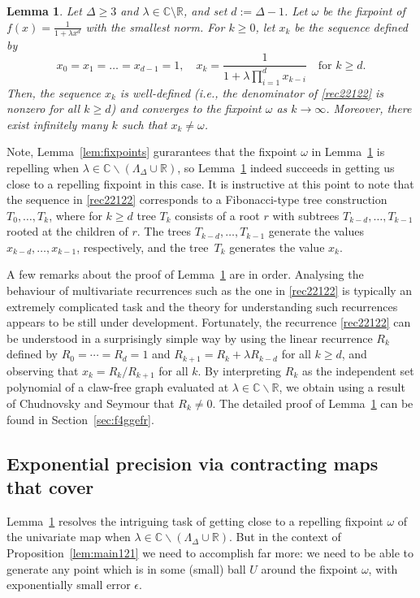 \documentclass[11pt]{article}
\newtheorem{lemma}[theorem]{Lemma}
\def\Reals{\mathbb{R}}
\def\Complex{\mathbb{C}}
\def\LambdaD{\Lambda_\Delta}
\begin{document}
\begin{lemma}\label{hop2}
Let $\Delta\geq 3$ and $\lambda\in \Complex\setminus\Reals$, and set $d:=\Delta-1$. Let $\omega$ be the fixpoint of $f(x)=\frac{1}{1+\lambda x^{d}}$ with the smallest norm. For $k\geq 0$, let $x_k$ be the sequence defined by
\begin{equation}\label{rec22122}
x_0=x_1=\dots=x_{d-1}=1, \quad x_k = \frac{1}{1+\lambda \prod_{i=1}^d x_{k-i}}\quad\mbox{for $k\geq d$}.
\end{equation}
Then, the sequence $x_k$ is well-defined (i.e., the denominator of \eqref{rec22122} is nonzero for all $k\geq d$) and converges to the fixpoint $\omega$ as $k\rightarrow \infty$. Moreover, there exist infinitely many $k$ such that $x_k\neq \omega$.
\end{lemma}
Note, Lemma~\ref{lem:fixpoints} gurarantees that the fixpoint $\omega$ in Lemma~\ref{hop2} is repelling when $\lambda\in \Complex\backslash(\LambdaD\cup \Reals)$, so Lemma~\ref{hop2} indeed succeeds in getting us close to a repelling fixpoint 
in this case.  It is instructive  at this point to note that the sequence in \eqref{rec22122} corresponds to a Fibonacci-type tree construction $T_0,\dots,T_k$, where for $k\geq d$ tree $T_k$ consists of a root $r$ with subtrees $T_{k-d},\dots,T_{k-1}$ rooted at the children of $r$.
The trees $T_{k-d},\ldots,T_{k-1}$ generate the values $x_{k-d},\hdots,x_{k-1}$, respectively,
and the tree~$T_k$ generates the   value $x_k$.


A few remarks about the proof of Lemma~\ref{hop2} are in order. Analysing the behaviour of multivariate recurrences such as the one in \eqref{rec22122} is typically an extremely complicated task and the theory for understanding such recurrences appears to be still under development. Fortunately, the recurrence \eqref{rec22122} can be understood in a surprisingly simple way by using the linear recurrence $R_k$ defined by $R_0=\cdots=R_d=1$ and $R_{k+1}=R_{k}+\lambda R_{k-d}$ for all $k\geq d$, and observing that $x_k=R_k/R_{k+1}$ for all $k$. By interpreting $R_k$ as the independent set polynomial of a claw-free graph evaluated at $\lambda\in \Complex\backslash \Reals$, we obtain using a result of Chudnovsky and Seymour \cite{DBLP:journals/jct/ChudnovskyS07} that $R_k\neq 0$. The detailed proof of Lemma~\ref{hop2} can be found in Section~\ref{sec:f4ggefr}.

\subsection{Exponential precision via contracting maps that cover}\label{sec:gbeyn}
Lemma~\ref{hop2} resolves the intriguing task of getting close to a repelling fixpoint $\omega$ of the univariate map when $\lambda\in \Complex\backslash(\LambdaD \cup \Reals)$. But in the context of  Proposition~\ref{lem:main121} we need to accomplish far more: we need to be able to generate any point which is in  some (small) ball $U$ around the fixpoint $\omega$, with exponentially small error $\epsilon$. 
\end{document}
